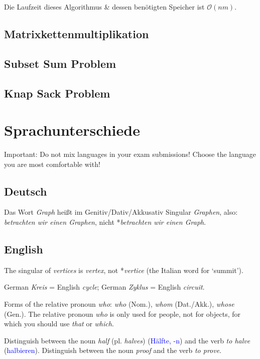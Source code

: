 \documentclass[a4paper]{article}
\begin{document}
Die Laufzeit dieses Algorithmus \& dessen benötigten Speicher ist $\mathcal{O}(nm)$.

\subsection{Matrixkettenmultiplikation}

\subsection{Subset Sum Problem}

\subsection{Knap Sack Problem}




\newpage

\section{Sprachunterschiede}
Important: Do not mix languages in your exam submissions! Choose the language you are most comfortable with!

\subsection{Deutsch}

Das Wort \emph{Graph} hei\ss t im Genitiv/Dativ/Akkusativ Singular \emph{Graphen}, also: \emph{betrachten wir einen Graphen}, nicht *\emph{betrachten wir einen Graph}.

\subsection{English}

The singular of \emph{vertices} is \emph{vertex}, not *\emph{vertice} (the Italian word for `summit').

German \emph{Kreis} = English \emph{cycle}; German \emph{Zyklus} = English \emph{circuit}.

Forms of the relative pronoun \emph{who}: \emph{who} (Nom.), \emph{whom} (Dat./Akk.), \emph{whose} (Gen.). The relative pronoun \emph{who} is only used for people, not for objects, for which you should use \emph{that} or \emph{which}.

Distinguish between the noun \emph{half} (pl. \emph{halves}) (\textcolor{blue}{Hälfte, -n}) and the verb \emph{to halve} (\textcolor{blue}{halbieren}). Distinguish between the noun \emph{proof} and the verb \emph{to prove}.
\end{document}
